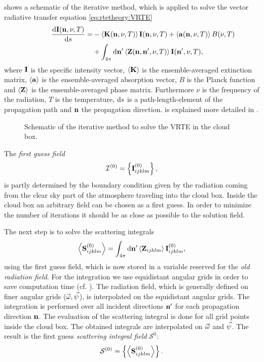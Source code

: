  shows a schematic of the iterative
method, which is applied to solve the vector radiative transfer
equation \eqref{eq:rtetheory:VRTE}
\begin{eqnarray}
  \frac {\DiffD\StoVec(\PDir, \nu, T)}{\DiffD s} =
    &{}-\EnsAvr{\ExtMat(\PDir, \nu, T)} \StoVec(\PDir, \nu, T) +
    \EnsAvr{\AbsVec(\PDir, \nu, T)} \rlap{$B(\nu, T)$} \\
    &{}+ \int_{4\pi} \DiffD\PDir' \EnsAvr{\PhaMat(\PDir, \PDir', \nu, T)} \StoVec(\PDir', \nu, T),
  \end{eqnarray}
  where ${\bf I}$ is the specific intensity vector, $\left\langle {\bf K} \right\rangle$
  is the ensemble-averaged extinction matrix, $\left\langle {\bf a} \right\rangle$ is the
  ensemble-averaged absorption vector, $B$ is the 
  Planck function and $\left\langle {\bf Z} \right\rangle$ is the ensemble-averaged
  phase matrix.  Furthermore $\nu$ is the frequency of the radiation,
  $T$ is the temperature, $\mathrm{d} s$ is a path-length-element of the
  propagation path and ${\bf n}$ the propagation direction.
   is explained more detailed in
  . 


\begin{figure}[t!]
  \caption{Schematic of the iterative method to solve the VRTE in the cloud box.}
  \label{fig:scattering:iteration_scheme}
\end{figure}

The \emph{first guess field}
\begin{equation}
  {\mathcal I}^{(0)} = \left\{{\bf I}^{(0)}_{ijklm}\right\},
\end{equation}
is partly determined by the boundary condition given by the radiation
coming from the clear sky part of the atmosphere traveling into the
cloud box.  Inside the cloud box an arbitrary field can be chosen as a
first guess. In order to minimize the number of iterations it should
be as close as possible to the solution field.

The next step is to solve the scattering integrals
\begin{equation}
  \left\langle {\bf S}^{(0)}_{ijklm} \right\rangle = \int_{4\pi} \mathrm{d} {\bf n}'
  \left\langle {\bf Z}_{ijklm} \right\rangle {\bf I}_{ijklm}^{(0)},
  \label{eq:scattering:scat-int}
\end{equation}
using the first guess field, which is now stored in a variable
reserved for the \emph{old radiation field}. For the integration we
use equidistant angular grids in order to save computation time (cf.
).  The radiation field, which is
generally defined on finer angular grids ($\vec{\omega},
\vec{\psi}$), is interpolated on the equidistant angular grids.
The integration is performed over all incident directions ${\bf n}'$ for
each propagation direction ${\bf n}$.  The evaluation of the scattering
integral is done for all grid points inside the cloud box. The
obtained integrals are interpolated on $\vec{\omega}$ and
$\vec{\psi}$.  The result is the first guess \emph{scattering
  integral field} ${\mathcal S}^{0}$:
\begin{equation}
  {\mathcal S}^{(0)} = \left\{\left\langle {\bf S}^{(0)}_{ijklm}  \right\rangle\right\}.  
\end{equation}

